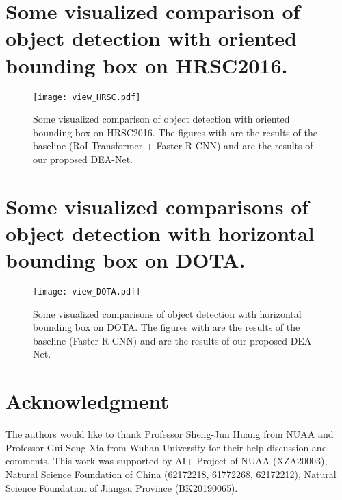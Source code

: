 \documentclass[journal]{IEEEtran}
\begin{document}


\clearpage


\appendices
\section{Some visualized comparison of object detection with oriented bounding box on HRSC2016.}
\begin{figure}[!htb]
	\centering
	\texttt{[image: view\_HRSC.pdf]}
	\caption{Some visualized comparison of object detection with oriented bounding box on HRSC2016. The figures with  are the results of the baseline (RoI-Transformer + Faster R-CNN) and  are the results of our proposed DEA-Net.} 
	\label{view_HRSC}
\end{figure}



\newpage
\section{Some visualized comparisons of object detection with horizontal bounding box on DOTA. }
\begin{figure}[!htb]
	\centering
	\texttt{[image: view\_DOTA.pdf]}
	\caption{Some visualized comparisons of object detection with horizontal bounding box on DOTA. The figures with  are the results of the baseline (Faster R-CNN) and  are the results of our proposed DEA-Net.}
	\label{view_DOTA}
\end{figure}





\section*{Acknowledgment}

The authors would like to thank Professor Sheng-Jun Huang from NUAA and Professor Gui-Song Xia from Wuhan University for their help discussion and comments. This work was supported by AI+ Project of NUAA (XZA20003), Natural Science Foundation of China (62172218, 61772268, 62172212), Natural Science Foundation of Jiangsu Province (BK20190065). 

\ifCLASSOPTIONcaptionsoff
  \newpage
\fi
\end{document}
